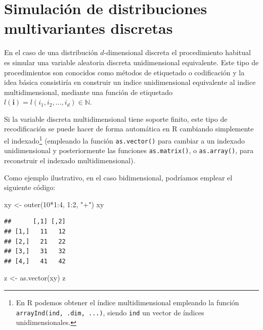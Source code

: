 \documentclass[
]{book}
\newenvironment{Shaded}{\begin{snugshade}}{\end{snugshade}}
\newcommand{\DecValTok}[1]{\textcolor[rgb]{0.00,0.00,0.81}{#1}}
\newcommand{\FunctionTok}[1]{\textcolor[rgb]{0.00,0.00,0.00}{#1}}
\newcommand{\NormalTok}[1]{#1}
\newcommand{\OtherTok}[1]{\textcolor[rgb]{0.56,0.35,0.01}{#1}}
\newcommand{\SpecialCharTok}[1]{\textcolor[rgb]{0.00,0.00,0.00}{#1}}
\newcommand{\StringTok}[1]{\textcolor[rgb]{0.31,0.60,0.02}{#1}}
\theoremstyle{break}
\theoremstyle{nonumberplain}
\begin{document}
\hypertarget{mult-discr}{%
\section{Simulación de distribuciones multivariantes discretas}\label{mult-discr}}

En el caso de una distribución \(d\)-dimensional discreta el procedimiento habitual es simular una variable aleatoria discreta unidimensional equivalente.
Este tipo de procedimientos son conocidos como métodos de etiquetado o codificación y la idea básica consistiría en construir un indice unidimensional equivalente al indice multidimensional, mediante una función de etiquetado
\(l(\mathbf{i}) = l\left(i_1, i_2, \ldots,i_d \right) \in \mathbb{N}\).

Si la variable discreta multidimensional tiene soporte finito, este tipo de recodificación se puede hacer de forma automática en R cambiando simplemente el indexado\footnote{En R podemos obtener el índice multidimensional empleando la función \texttt{arrayInd(ind,\ .dim,\ ...)}, siendo \texttt{ind} un vector de índices unidimensionales.} (empleando la función \texttt{as.vector()} para cambiar a un indexado unidimensional y posteriormente las funciones \texttt{as.matrix()}, o \texttt{as.array()}, para reconstruir el indexado multidimensional).

Como ejemplo ilustrativo, en el caso bidimensional, podríamos emplear el siguiente código:

\begin{Shaded}
\begin{Highlighting}[]
\NormalTok{xy }\OtherTok{\textless{}{-}} \FunctionTok{outer}\NormalTok{(}\DecValTok{10}\SpecialCharTok{*}\DecValTok{1}\SpecialCharTok{:}\DecValTok{4}\NormalTok{, }\DecValTok{1}\SpecialCharTok{:}\DecValTok{2}\NormalTok{, }\StringTok{"+"}\NormalTok{)}
\NormalTok{xy}
\end{Highlighting}
\end{Shaded}

\begin{verbatim}
##      [,1] [,2]
## [1,]   11   12
## [2,]   21   22
## [3,]   31   32
## [4,]   41   42
\end{verbatim}

\begin{Shaded}
\begin{Highlighting}[]
\NormalTok{z }\OtherTok{\textless{}{-}} \FunctionTok{as.vector}\NormalTok{(xy)}
\NormalTok{z}
\end{Highlighting}
\end{Shaded}
\end{document}
